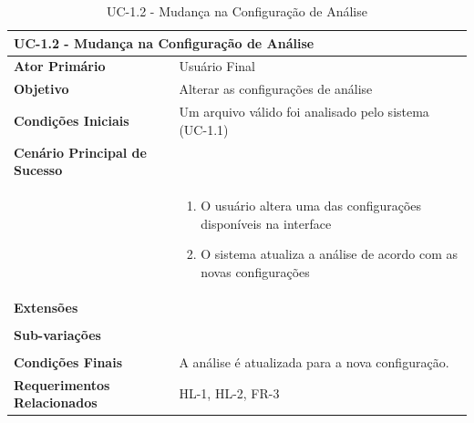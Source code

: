 \documentclass[12pt]{article}
\begin{document}
\begin{table}[H]
	\caption{UC-1.2 - Mudança na Configuração de Análise}
	\begin{tabular}{p{6cm} p{8cm}}
		\multicolumn{2}{l}{\large{\textbf{UC-1.2 - Mudança na Configuração de Análise}}}\\
		\toprule
		\textbf{Ator Primário}		&	Usuário Final \\
		\midrule
		\textbf{Objetivo}			&	Alterar as configurações de análise \\
		\midrule
		\textbf{Condições Iniciais}	&	Um arquivo válido foi analisado pelo sistema (UC-1.1)\\
		\midrule
		\textbf{Cenário Principal de Sucesso}	& \\
		& \begin{enumerate}
			\item O usuário altera uma das configurações disponíveis na interface
			\item O sistema atualiza a análise de acordo com as novas configurações
		\end{enumerate}\\
		\midrule
		\textbf{Extensões}	& \\
		& \\
		\midrule
		\textbf{Sub-variações} & \\
		& \\
		\midrule
		\textbf{Condições Finais} & A análise é atualizada para a nova configuração. \\
		\midrule
		\textbf{Requerimentos Relacionados} & HL-1, HL-2, FR-3\\
		\bottomrule
	\end{tabular}		
\end{table}
\end{document}

